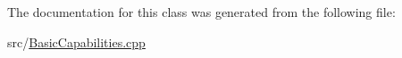 The documentation for this class was generated from the following file\+:\begin{DoxyCompactItemize}
\item 
src/\hyperlink{BasicCapabilities_8cpp}{Basic\+Capabilities.\+cpp}\end{DoxyCompactItemize}
